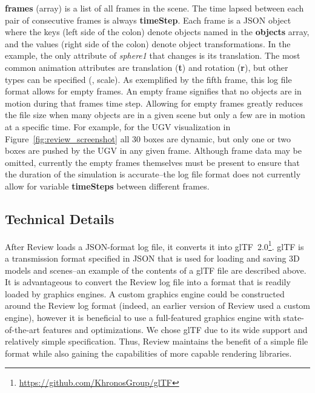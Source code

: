 \textbf{frames} (array) is a list of all frames in the scene. The time lapsed between each pair of consecutive frames is always \textbf{timeStep}.
%
Each frame is a JSON object where the keys (left side of the colon) denote objects named in the \textbf{objects} array, and the values (right side of the colon) denote object transformations.
%
In the example, the only attribute of \emph{sphere1} that changes is its translation. The most common animation attributes are translation (\textbf{t}) and rotation (\textbf{r}), but other types can be specified (\eg{}, scale).
%
As exemplified by the fifth frame, this log file format allows for empty frames. An empty frame signifies that no objects are in motion during that frames time step. Allowing for empty frames greatly reduces the file size when many objects are in a given scene but only a few are in motion at a specific time.
%
For example, for the UGV visualization in Figure~\ref{fig:review_screenshot} all 30 boxes are dynamic, but only one or two boxes are pushed by the UGV in any given frame.
%
Although frame data may be omitted, currently the empty frames themselves must be present to ensure that the duration of the simulation is accurate--the log file format does not currently allow for variable \textbf{timeSteps} between different frames.






\subsection{Technical Details}

After Review loads a JSON-format log file, it converts it into glTF~2.0\footnote{\url{https://github.com/KhronosGroup/glTF}}.
%
glTF is a transmission format specified in JSON that is used for loading and saving 3D models and scenes--an example of the contents of a glTF file are described above.
%
It is advantageous to convert the Review log file into a format that is readily loaded by graphics engines.
%
A custom graphics engine could be constructed around the Review log format (indeed, an earlier version of Review used a custom engine), however it is beneficial to use a full-featured graphics engine with state-of-the-art features and optimizations.
%
We chose glTF due to its wide support and relatively simple specification.
%
%
Thus, Review maintains the benefit of a simple file format while also gaining the capabilities of more capable rendering libraries.


